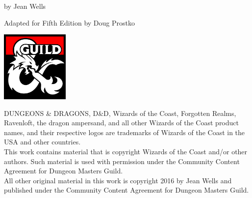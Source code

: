 \documentclass[10pt,twoside,twocolumn]{book}
\begin{document}
\begin{titlepage}
\begin{onecolumn}
\begin{center}
	\vspace{0.5cm}

	
	{\Large by Jean Wells}

	{\Large Adapted for Fifth Edition by Doug Prostko}
	
	\vspace{0.35cm}
	\includegraphics[width=0.25\textwidth]{img/dmsguild.jpg}
\end{center}

\begin{minipage}{0.94\textwidth}
{\footnotesize
	DUNGEONS \& DRAGONS, D\&D, Wizards of the Coast, Forgotten Realms,
	Ravenloft, the dragon ampersand, and all other Wizards of the Coast
	product names, and their respective logos are trademarks of Wizards
	of the Coast in the USA and other countries.\\ This work contains
	material that is copyright Wizards of the Coast and/or other
	authors. Such material is used with permission under the Community
	Content Agreement for Dungeon Masters Guild.\\ All other original
	material in this work is copyright 2016 by Jean Wells and published
	under the Community Content Agreement for Dungeon Masters Guild.}
\end{minipage} \end{onecolumn} \end{titlepage} \clearpage

\renewcommand{\cfttoctitlefont}{\color{titlered}\normalfont\scshape\Huge}
\setcounter{tocdepth}{2}\tableofcontents








\end{document}
